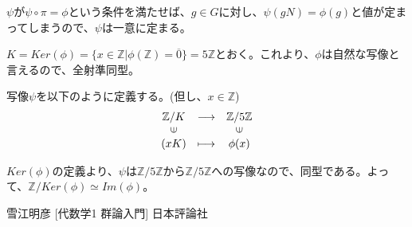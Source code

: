 \documentclass[dvipdfmx,autodetect-engine]{jsarticle}
\begin{document}
$\psi$が$\psi \circ \pi = \phi$という条件を満たせば、$g \in G$に対し、$\psi(gN) = \phi(g)$と値が定まってしまうので、$\psi$は一意に定まる。



$K = Ker(\phi) = \{x \in \mathbb{Z}| \phi(\mathbb{Z}) = \overline{0}\} = 5\mathbb{Z}$とおく。これより、$\phi$は自然な写像と言えるので、全射準同型。

写像$\psi$を以下のように定義する。(但し、$x \in \mathbb{Z}$)
$$
\begin{array}{ccc}
\mathbb{Z}/K & {\longrightarrow}  & \mathbb{Z}/5\mathbb{Z} \\
\rotatebox{90}{$\in$} & & \rotatebox{90}{$\in$} \\
(xK) & \longmapsto & \phi(x)
\end{array}
$$

$Ker(\phi)$の定義より、$\psi$は$\mathbb{Z}/5\mathbb{Z}$から$\mathbb{Z}/5\mathbb{Z}$への写像なので、同型である。よって、$\mathbb{Z}/Ker(\phi) \simeq Im(\phi)$。

\begin{thebibliography}{n}
 雪江明彦 [代数学1 群論入門] 日本評論社
\end{thebibliography}
\end{document}
